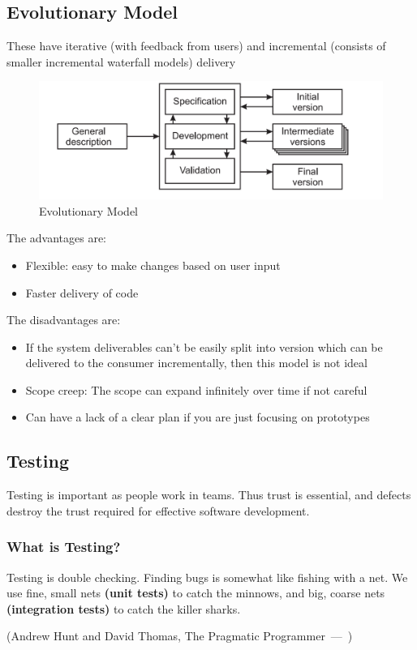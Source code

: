 \documentclass{article}
\let\oldquote\quote
\let\endoldquote\endquote
\renewenvironment{quote}[2][]
  {\if\relax\detokenize{#1}\relax
     \def\quoteauthor{#2}%
   \else
     \def\quoteauthor{#2~---~#1}%
   \fi
   \oldquote}
  {\par\nobreak\smallskip\hfill(\quoteauthor)%
   \endoldquote\addvspace{\bigskipamount}}
\begin{document}
\subsection{Evolutionary Model}
These have iterative (with feedback from users) and incremental (consists of smaller incremental waterfall models) delivery
\begin{figure}[H]
    \centering
\includegraphics[width=0.6\linewidth]{Pictures/Screenshot 2023-02-08 at 12.33.18.png}
\caption{Evolutionary Model}
\end{figure}
The advantages are:
\begin{itemize}
    \item Flexible: easy to make changes based on user input
    \item Faster delivery of code
\end{itemize}
The disadvantages are:
\begin{itemize}
    \item If the system deliverables can't be easily split into version which can be delivered to the consumer incrementally, then this model is not ideal
    \item Scope creep: The scope can expand infinitely over time if not careful
    \item Can have a lack of a clear plan if you are just focusing on prototypes
\end{itemize}
\subsection{Testing}
Testing is important as people work in teams. Thus trust is essential, and defects destroy the trust required for effective software development.
\subsubsection*{What is Testing?}
Testing is double checking. 
\begin{quote}{Andrew Hunt and David Thomas, The Pragmatic Programmer}
Finding bugs is somewhat like fishing with a net. We use fine, small nets \textbf{(unit tests)}
 to catch the minnows, and big, coarse nets \textbf{(integration tests)} to catch the killer sharks.
\end{quote}
\end{document}
